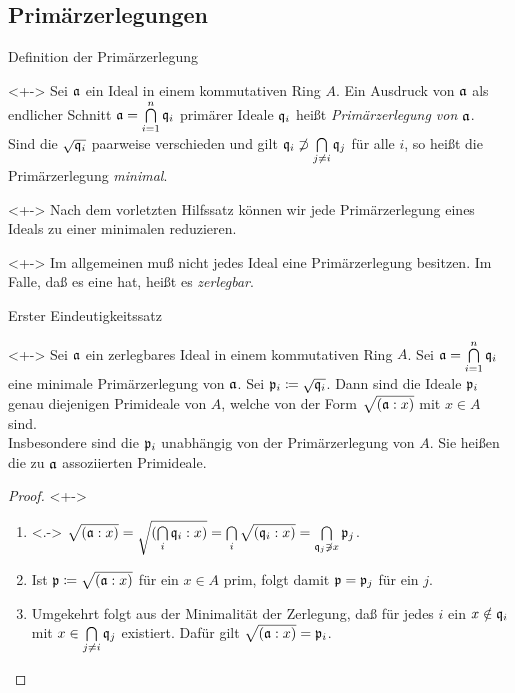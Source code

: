 \subsection{Primärzerlegungen}

\begin{frame}{Definition der Primärzerlegung}
	\begin{definition}<+->
		Sei \(\mathfrak{a}\) ein Ideal in einem kommutativen Ring \(A\). Ein Ausdruck von \(\mathfrak{a}\) als endlicher Schnitt
		\(\mathfrak{a} = \bigcap\limits_{i = 1}^n \mathfrak{q}_i\) primärer Ideale \(\mathfrak{q}_i\) heißt \emph{Primärzerlegung von \(\mathfrak{a}\)}.
		\\
		Sind die \(\sqrt{\mathfrak{q}_i}\) paarweise verschieden und gilt \(\mathfrak{q}_i \not\supset \bigcap\limits_{j \neq i}
		\mathfrak{q}_j\) für alle \(i\), so heißt die Primärzerlegung \emph{minimal}.
	\end{definition}
	\begin{remark}<+->
		Nach dem vorletzten Hilfssatz können wir jede Primärzerlegung eines Ideals zu einer minimalen reduzieren.
	\end{remark}
	\begin{remark}<+->
		Im allgemeinen muß nicht jedes Ideal eine Primärzerlegung besitzen. Im Falle, daß es eine hat, heißt es \emph{zerlegbar}.
	\end{remark}
\end{frame}

\begin{frame}{Erster Eindeutigkeitssatz}
	\begin{theorem}<+->
		\label{thm:first_uniqueness}
		Sei \(\mathfrak{a}\) ein zerlegbares Ideal in einem kommutativen Ring \(A\). Sei \(\mathfrak{a} = \bigcap\limits_{i = 1}^n \mathfrak{q}_i\) eine minimale Primärzerlegung von \(\mathfrak{a}\). Sei \(\mathfrak{p}_i \coloneqq \sqrt{\mathfrak{q}_i}\). Dann sind die Ideale
		\(\mathfrak{p}_i\) genau diejenigen Primideale von \(A\), welche von der Form \(\sqrt{(\mathfrak{a} : x)}\) mit \(x \in A\) sind.
		\\
		Insbesondere sind die \(\mathfrak{p}_i\) unabhängig von der Primärzerlegung von \(A\). Sie heißen die 			\alert{zu \(\mathfrak{a}\)
		assoziierten Primideale}.
	\end{theorem}
	\begin{proof}<+->
		\begin{enumerate}[<+->]
		\item<.->
			\(\sqrt{(\mathfrak{a} : x)} = \sqrt{(\bigcap\limits_i \mathfrak{q}_i : x)} = \bigcap\limits_i
			\sqrt{(\mathfrak{q}_i : x)} = \bigcap\limits_{\mathfrak{q}_j \not\ni x} \mathfrak{p}_j\).
		\item
			Ist \(\mathfrak{p} \coloneqq \sqrt{(\mathfrak{a} : x)}\) für ein \(x \in A\) prim, folgt damit \(\mathfrak{p} = \mathfrak{p}_j\) für ein
			\(j\).
		\item
			Umgekehrt folgt aus der Minimalität der Zerlegung, daß für jedes \(i\) ein \(x \notin \mathfrak{q}_i\) mit
			\(x \in \bigcap\limits_{j \neq i} \mathfrak{q}_j\) existiert. Dafür gilt \(\sqrt{(\mathfrak{a} : x)} = \mathfrak{p}_i\).
			\qedhere
		\end{enumerate}
	\end{proof}
\end{frame}

